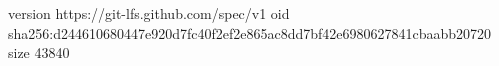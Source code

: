 version https://git-lfs.github.com/spec/v1
oid sha256:d244610680447e920d7fc40f2ef2e865ac8dd7bf42e6980627841cbaabb20720
size 43840
